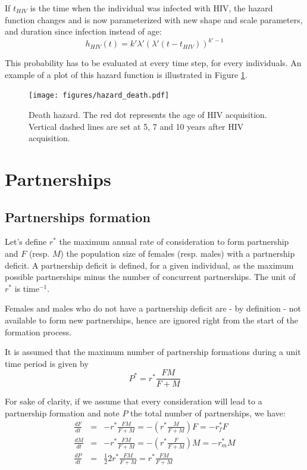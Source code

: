\documentclass[11pt, onecolumn]{article}
\begin{document}
If $t_{HIV}$ is the time when the individual was infected with HIV, the hazard function changes and is now parameterized with new shape and scale parameters, and duration since infection instead of age:
$$h_{HIV}(t) = k'\lambda'(\lambda' (t-t_{HIV}))^{k'-1}$$

This probability has to be evaluated at every time step, for every individuals. An example of a plot of this hazard function is illustrated in Figure \ref{fig:deathHazard}.

\begin{figure}[!ht]
\centering
    \texttt{[image: figures/hazard\_death.pdf]}
\caption{Death hazard. The red dot represents the age of HIV acquisition. Vertical dashed lines are set at 5, 7 and 10 years after HIV acquisition.}
\label{fig:deathHazard}
\end{figure}





\section{Partnerships}


\subsection{Partnerships formation}

Let's define $r^*$ the maximum annual rate of consideration to form partnership and $F$ (resp. $M$) the population size of females (resp. males) with a partnership deficit. A partnership deficit is defined, for a given individual, as the maximum possible partnerships minus the number of concurrent partnerships. The unit of $r^*$ is time$^{-1}$.

Females and males who do not have a partnership deficit are - by definition - not available to form new partnerships, hence are ignored right from the start of the formation process.

It is assumed that the maximum number of partnership formations during a unit time period is given by  \cite{Dietz:1988tl} 
$$P^* = r^*\frac{FM}{F+M}$$

For sake of clarity, if we assume that every consideration will lead to a partnership formation and note $P$ the total number of partnerships, we have:
\begin{eqnarray*}
\frac{dF}{dt} & = & - r^*\frac{FM}{F+M} =  -\left(r^*\frac{M}{F+M}\right) F = -r^*_f F\\
\frac{dM}{dt} & = & - r^*\frac{FM}{F+M} =  -\left(r^*\frac{F}{F+M}\right) M = -r^*_m M\\
\frac{dP}{dt} & = & \frac{1}{2}2r^*\frac{FM}{F+M} = r^*\frac{FM}{F+M}
\end{eqnarray*}
\end{document}
